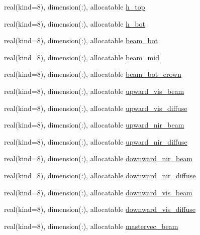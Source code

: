 \begin{DoxyCompactItemize}
\item 
real(kind=8), dimension(\+:), allocatable \hyperlink{namespacecanopy__layer__coms_a16fa644c3a2ec33a530019e5b5caf16c}{h\+\_\+top}
\item 
real(kind=8), dimension(\+:), allocatable \hyperlink{namespacecanopy__layer__coms_a0d074763380f49037306d0846a05a072}{h\+\_\+bot}
\item 
real(kind=8), dimension(\+:), allocatable \hyperlink{namespacecanopy__layer__coms_ac615341c5a6730cb3d29b27ed4109313}{beam\+\_\+bot}
\item 
real(kind=8), dimension(\+:), allocatable \hyperlink{namespacecanopy__layer__coms_a3e967ac0256075263e0833a70ec74b48}{beam\+\_\+mid}
\item 
real(kind=8), dimension(\+:), allocatable \hyperlink{namespacecanopy__layer__coms_a5930f10d661ed6a082683d2ab86f3d87}{beam\+\_\+bot\+\_\+crown}
\item 
real(kind=8), dimension(\+:), allocatable \hyperlink{namespacecanopy__layer__coms_af2f13bc441f2087ceba83cde5d17e7c8}{upward\+\_\+vis\+\_\+beam}
\item 
real(kind=8), dimension(\+:), allocatable \hyperlink{namespacecanopy__layer__coms_a8c51c8b265b6e659631e5012541c8479}{upward\+\_\+vis\+\_\+diffuse}
\item 
real(kind=8), dimension(\+:), allocatable \hyperlink{namespacecanopy__layer__coms_a87d36be7a31ec3b7987bb3d6229d351c}{upward\+\_\+nir\+\_\+beam}
\item 
real(kind=8), dimension(\+:), allocatable \hyperlink{namespacecanopy__layer__coms_a6d5e9951def0e14a6090ee63c3580188}{upward\+\_\+nir\+\_\+diffuse}
\item 
real(kind=8), dimension(\+:), allocatable \hyperlink{namespacecanopy__layer__coms_a32aa604fa9c594a9d4256b80bd3ebf29}{downward\+\_\+nir\+\_\+beam}
\item 
real(kind=8), dimension(\+:), allocatable \hyperlink{namespacecanopy__layer__coms_aca68716ee0d7012206db14db5e8efdf0}{downward\+\_\+nir\+\_\+diffuse}
\item 
real(kind=8), dimension(\+:), allocatable \hyperlink{namespacecanopy__layer__coms_ab664e3f1fcb600d0d80f4f2b20826118}{downward\+\_\+vis\+\_\+beam}
\item 
real(kind=8), dimension(\+:), allocatable \hyperlink{namespacecanopy__layer__coms_a3daf45d80c36a9b92a031d8865ceb5a8}{downward\+\_\+vis\+\_\+diffuse}
\item 
real(kind=8), dimension(\+:), allocatable \hyperlink{namespacecanopy__layer__coms_a0180ffcdf520f0876e1b0246cc2f97d0}{mastervec\+\_\+beam}

\end{DoxyCompactItemize}
